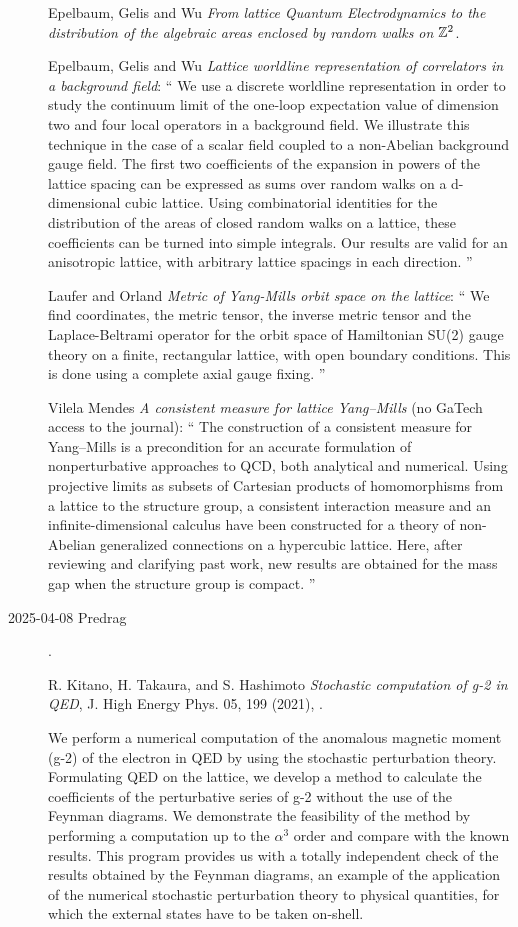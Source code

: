 \begin{description}
Epelbaum, Gelis and Wu
{\em From lattice Quantum Electrodynamics to the distribution of
    the algebraic areas enclosed by random walks on $\mathbb{Z}^2$}.


Epelbaum, Gelis and Wu
{\em Lattice worldline representation of correlators in a background field}: ``
We use a discrete worldline representation in order to study the continuum
limit of the one-loop expectation value of dimension two and four local
operators in a background field. We illustrate this technique in the case of
a scalar field coupled to a non-Abelian background gauge field. The first two
coefficients of the expansion in powers of the lattice spacing can be
expressed as sums over random walks on a d-dimensional cubic lattice. Using
combinatorial identities for the distribution of the areas of closed random
walks on a lattice, these coefficients can be turned into simple integrals.
Our results are valid for an anisotropic lattice, with arbitrary lattice
spacings in each direction.
''

Laufer and Orland
{\em Metric of {Yang-Mills} orbit space on the lattice}: ``
We find coordinates, the metric tensor, the inverse metric tensor and the
Laplace-Beltrami operator for the orbit space of Hamiltonian SU(2) gauge
theory on a finite, rectangular lattice, with open boundary conditions. This
is done using a complete axial gauge fixing.
''

Vilela Mendes {\em A consistent measure for lattice Yang–Mills}
(no GaTech access to the journal): ``
The construction of a consistent measure for Yang–Mills is a precondition for
an accurate formulation of nonperturbative approaches to QCD, both analytical
and numerical. Using projective limits as subsets of Cartesian products of
homomorphisms from a lattice to the structure group, a consistent interaction
measure and an infinite-dimensional calculus have been constructed for a
theory of non-Abelian generalized connections on a hypercubic lattice. Here,
after reviewing and clarifying past work, new results are obtained for the
mass gap when the structure group is compact.
''

\item[2025-04-08 Predrag].

R. Kitano, H. Takaura, and S. Hashimoto
{\em Stochastic computation of g-2 in QED}, 
J. High Energy Phys. 05, 199 (2021), .

We perform a numerical computation of the anomalous magnetic moment (g-2) 
of the electron in QED by using the stochastic perturbation theory. 
Formulating QED on the lattice, we develop a method to calculate the 
coefficients of the perturbative series of g-2 without the use of the 
Feynman diagrams. We demonstrate the feasibility of the method by 
performing a computation up to the $\alpha^3$  order and compare with the 
known results. This program provides us with a totally independent check 
of the results obtained by the Feynman diagrams, an example of the 
application of the numerical stochastic perturbation theory to physical 
quantities, for which the external states have to be taken on-shell. 


\end{description}
